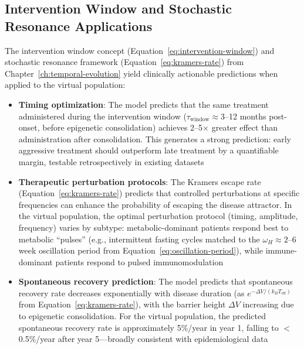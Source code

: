\subsection{Intervention Window and Stochastic Resonance Applications}

The intervention window concept (Equation~\ref{eq:intervention-window}) and stochastic resonance framework (Equation~\ref{eq:kramers-rate}) from Chapter~\ref{ch:temporal-evolution} yield clinically actionable predictions when applied to the virtual population:

\begin{itemize}
    \item \textbf{Timing optimization}: The model predicts that the same treatment administered during the intervention window ($\tau_{\text{window}} \approx 3$--12 months post-onset, before epigenetic consolidation) achieves 2--5$\times$ greater effect than administration after consolidation. This generates a strong prediction: early aggressive treatment should outperform late treatment by a quantifiable margin, testable retrospectively in existing datasets
    \item \textbf{Therapeutic perturbation protocols}: The Kramers escape rate (Equation~\ref{eq:kramers-rate}) predicts that controlled perturbations at specific frequencies can enhance the probability of escaping the disease attractor. In the virtual population, the optimal perturbation protocol (timing, amplitude, frequency) varies by subtype: metabolic-dominant patients respond best to metabolic ``pulses'' (e.g., intermittent fasting cycles matched to the $\omega_H \approx 2$--6 week oscillation period from Equation~\ref{eq:oscillation-period}), while immune-dominant patients respond to pulsed immunomodulation
    \item \textbf{Spontaneous recovery prediction}: The model predicts that spontaneous recovery rate decreases exponentially with disease duration (as $e^{-\Delta V/(k_B T_{\text{eff}})}$ from Equation~\ref{eq:kramers-rate}), with the barrier height $\Delta V$ increasing due to epigenetic consolidation. For the virtual population, the predicted spontaneous recovery rate is approximately 5\%/year in year 1, falling to $<$0.5\%/year after year 5---broadly consistent with epidemiological data~\cite{Cairns2005prognosis}
\end{itemize}

